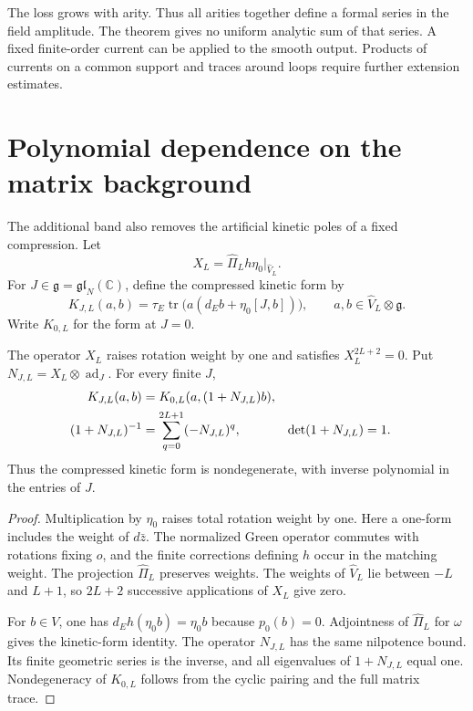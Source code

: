 The loss grows with arity. Thus all arities together define a formal
series in the field amplitude. The theorem gives no uniform analytic
sum of that series. A fixed finite-order current can be applied to
the smooth output. Products of currents on a common support and
traces around loops require further extension estimates.

\section{Polynomial dependence on the matrix background}

The additional band also removes the artificial kinetic poles of a
fixed compression. Let
\[
 X_L=\widehat\Pi_Lh\eta_0|_{\widehat V_L}.
\]
For $J\in\mathfrak g=\mathfrak{gl}_N(\mathbb C)$, define the
compressed kinetic form by
\[
 K_{J,L}(a,b)=\tau_E\operatorname{tr}
                     \bigl(a(d_Eb+\eta_0[J,b])\bigr),
 \qquad a,b\in\widehat V_L\otimes\mathfrak g.
\]
Write $K_{0,L}$ for the form at $J=0$.

\begin{proposition}\label{mht:prop:angular-background}
The operator $X_L$ raises rotation weight by one and satisfies
$X_L^{2L+2}=0$. Put $N_{J,L}=X_L\otimes\operatorname{ad}_J$.
For every finite $J$,
\begin{align}
 K_{J,L}(a,b)&=K_{0,L}(a,(1+N_{J,L})b),\notag\\
 (1+N_{J,L})^{-1}&=\sum_{q=0}^{2L+1}(-N_{J,L})^q,&
 \det(1+N_{J,L})&=1.
 \label{mht:eq:angular-background-inverse}
\end{align}
Thus the compressed kinetic form is nondegenerate, with inverse
polynomial in the entries of $J$.
\end{proposition}

\begin{proof}
Multiplication by $\eta_0$ raises total rotation weight by one.
Here a one-form includes the weight of $d\bar z$.
The normalized Green operator commutes with rotations fixing $o$,
and the finite corrections defining $h$ occur in the matching weight.
The projection $\widehat\Pi_L$ preserves weights. The weights of
$\widehat V_L$ lie between $-L$ and $L+1$, so $2L+2$ successive
applications of $X_L$ give zero.

For $b\in V$, one has $d_Eh(\eta_0b)=\eta_0b$ because
$p_0(b)=0$. Adjointness of $\widehat\Pi_L$ for $\omega$ gives the
kinetic-form identity. The operator $N_{J,L}$ has the same
nilpotence bound. Its finite geometric series is the inverse, and
all eigenvalues of $1+N_{J,L}$ equal one. Nondegeneracy of
$K_{0,L}$ follows from the cyclic pairing and the full matrix trace.
\end{proof}

